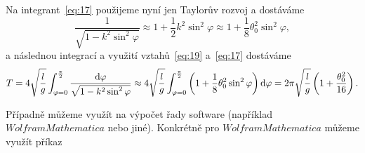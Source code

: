 \documentclass[reqno, a4paper]{amsart}
\begin{document}
		Na integrant~\eqref{eq:17} použijeme nyní jen Taylorův rozvoj a dostáváme
		\begin{equation}
			\label{eq:19}
			\frac{1}
			{
				\sqrt{1 - k^2 \sin^2 \varphi}
			}
			\approx
			1
			+
			\frac{1}{2}
			k^2
			\sin^2 \varphi
			\approx
			1
			+
			\frac{1}{8}
			\theta_{0}^2
			\sin^2 \varphi
			,
		\end{equation}
		a následnou integrací a využití vztahů~\eqref{eq:19} a~\eqref{eq:17} dostáváme
		\begin{equation}
			\label{eq:20}
			T
			=
			4
			\sqrt{
				\frac{l}{g}
			}
			\int_{\varphi=0}^{\frac{\pi}{2}}
			\frac{\mathrm{d} \varphi}
			{
				\sqrt{1 - k^2 \sin^2 \varphi}
			}
			\approx
			4
			\sqrt{
				\frac{l}{g}
			}
			\int_{\varphi=0}^{\frac{\pi}{2}}
			\left(
			1
			+
			\frac{1}{8}
			\theta_{0}^2
			\sin^2 \varphi
			\right)
			\mathrm{d} \varphi
			=
			2\pi
			\sqrt{\frac{l}{g}}
			\left(
			1
			+
			\frac{\theta_{0}^2}{16}
			\right)
			.
		\end{equation}
		
		Případně můžeme využít na výpočet řady software (například $ Wolfram Mathematica $ nebo jiné). Konkrétně pro $ Wolfram Mathematica $ můžeme využít příkaz
		
\end{document}
